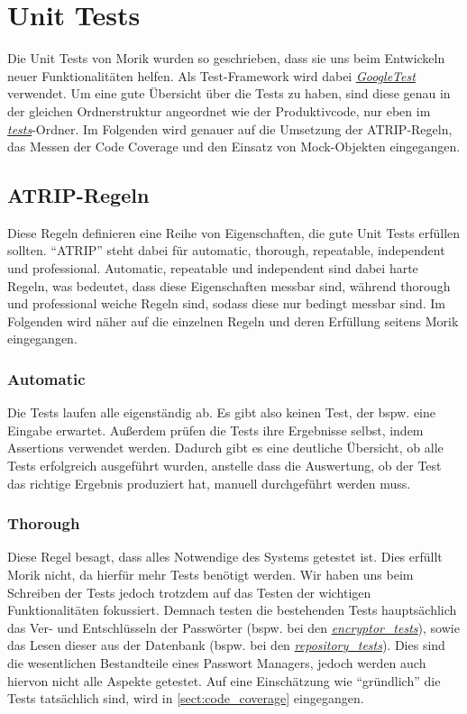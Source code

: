 \chapter{Unit Tests}
Die Unit Tests von Morik wurden so geschrieben, dass sie uns beim Entwickeln neuer Funktionalitäten helfen. Als Test-Framework wird dabei \href{https://github.com/moorts/Morik/blob/main/src/CMakeLists.txt#L27}{\textit{GoogleTest}} verwendet. Um eine gute Übersicht über die Tests zu haben, sind diese genau in der gleichen Ordnerstruktur angeordnet wie der Produktivcode, nur eben im \href{https://github.com/moorts/Morik/tree/main/src/tests}{\textit{tests}}-Ordner. Im Folgenden wird genauer auf die Umsetzung der ATRIP-Regeln, das Messen der Code Coverage und den Einsatz von Mock-Objekten eingegangen.

\section{ATRIP-Regeln}
Diese Regeln definieren eine Reihe von Eigenschaften, die gute Unit Tests erfüllen sollten. \enquote{ATRIP} steht dabei für automatic, thorough, repeatable, independent und professional. Automatic, repeatable und independent sind dabei harte Regeln, was bedeutet, dass diese Eigenschaften messbar sind, während thorough und professional weiche Regeln sind, sodass diese nur bedingt messbar sind. Im Folgenden wird näher auf die einzelnen Regeln und deren Erfüllung seitens Morik eingegangen.

\subsection{Automatic}
Die Tests laufen alle eigenständig ab. Es gibt also keinen Test, der bspw. eine Eingabe erwartet. Außerdem prüfen die Tests ihre Ergebnisse selbst, indem Assertions verwendet werden. Dadurch gibt es eine deutliche Übersicht, ob alle Tests erfolgreich ausgeführt wurden, anstelle dass die Auswertung, ob der Test das richtige Ergebnis produziert hat, manuell durchgeführt werden muss.

\subsection{Thorough}
Diese Regel besagt, dass alles Notwendige des Systems getestet ist. Dies erfüllt Morik nicht, da hierfür mehr Tests benötigt werden. Wir haben uns beim Schreiben der Tests jedoch trotzdem auf das Testen der wichtigen Funktionalitäten fokussiert. Demnach testen die bestehenden Tests hauptsächlich das Ver- und Entschlüsseln der Passwörter (bspw. bei den \href{https://github.com/moorts/Morik/blob/main/src/tests/application/encryptor_tests.cpp}{\textit{encryptor\_tests}}), sowie das Lesen dieser aus der Datenbank (bspw. bei den \href{https://github.com/moorts/Morik/blob/main/src/tests/application/repository_tests.cpp}{\textit{repository\_tests}}). Dies sind die wesentlichen Bestandteile eines Passwort Managers, jedoch werden auch hiervon nicht alle Aspekte getestet. Auf eine Einschätzung wie \enquote{gründlich} die Tests tatsächlich sind, wird in \autoref{sect:code_coverage} eingegangen.

